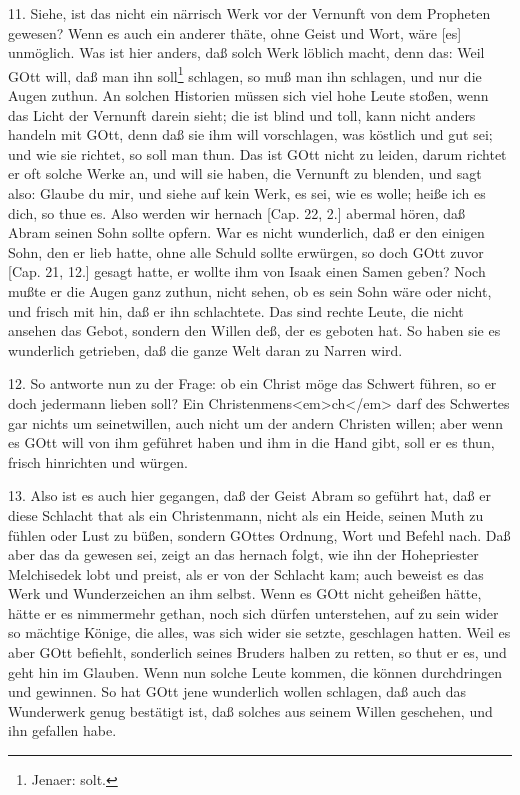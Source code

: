 11. Siehe, ist das nicht ein närrisch Werk vor der Vernunft von dem Propheten gewesen? Wenn es auch ein anderer thäte, ohne Geist und Wort, wäre [es] unmöglich. Was ist hier anders, daß solch Werk löblich macht, denn das: Weil GOtt will, daß man ihn soll\footnote{Jenaer: solt.} schlagen, so muß man ihn schlagen, und nur die Augen zuthun. An solchen Historien müssen sich viel hohe Leute stoßen, wenn das Licht der Vernunft darein sieht; die ist blind und toll, kann nicht anders handeln mit GOtt, denn daß sie ihm will vorschlagen, was köstlich und gut sei; und wie sie richtet, so soll man thun. Das ist GOtt nicht zu leiden, darum richtet er oft solche Werke an, und will sie haben, die Vernunft zu blenden, und sagt also: Glaube du mir, und siehe auf kein Werk, es sei, wie es wolle; heiße ich es dich, so thue es. Also werden wir hernach [Cap. 22, 2.] abermal hören, daß Abram seinen Sohn sollte opfern. War es nicht wunderlich, daß er den einigen Sohn, den er lieb hatte, ohne alle Schuld sollte erwürgen, so doch GOtt zuvor [Cap. 21, 12.] gesagt hatte, er wollte ihm von Isaak einen Samen geben? Noch mußte er die Augen ganz zuthun, nicht sehen, ob es sein Sohn
wäre oder nicht, und frisch mit hin, daß er ihn schlachtete. Das sind rechte Leute, die nicht ansehen das Gebot, sondern den Willen deß, der es geboten hat. So haben sie es wunderlich getrieben, daß die ganze Welt daran zu Narren wird.

12. So antworte nun zu der Frage: ob ein Christ möge das Schwert führen, so er doch jedermann lieben soll? Ein Christenmens<em>ch</em> darf des Schwertes gar nichts um seinetwillen, auch nicht um der andern Christen willen; aber wenn es GOtt will von ihm geführet haben und ihm in die Hand gibt, soll er es thun, frisch hinrichten und würgen.

13. Also ist es auch hier gegangen, daß der Geist Abram so geführt hat, daß er diese Schlacht that als ein Christenmann, nicht als ein Heide, seinen Muth zu fühlen oder Lust zu büßen, sondern GOttes Ordnung, Wort und Befehl nach. Daß aber das da gewesen sei, zeigt an das hernach folgt, wie ihn der Hohepriester Melchisedek lobt und preist, als er von der Schlacht kam; auch beweist es das Werk und Wunderzeichen an ihm selbst. Wenn es GOtt nicht geheißen hätte, hätte er es nimmermehr gethan, noch sich dürfen unterstehen, auf zu sein wider so mächtige Könige, die alles, was sich wider sie setzte, geschlagen hatten. Weil es aber GOtt befiehlt, sonderlich seines Bruders halben zu retten, so thut er es, und geht hin im Glauben. Wenn nun solche Leute kommen, die können durchdringen und gewinnen. So hat GOtt jene wunderlich wollen schlagen, daß auch das Wunderwerk genug bestätigt ist, daß solches aus seinem Willen geschehen, und ihn gefallen habe.

